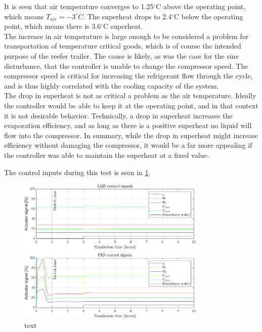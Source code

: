 It is seen that air temperature converges to 1.25$^{\circ}$C above the operating point, which means $T_{air} = -3^{\circ}C$. The superheat drops to 2.4$^{\circ}$C below the operating point, which means there is 3.6$^{\circ}$C superheat.\\

The increase in air temperature is large enough to be considered a problem for transportation of temperature critical goods, which is of course the intended purpose of the reefer trailer. The cause is likely, as was the case for the sine disturbance, that the controller is unable to change the compressor speed. The compressor speed is critical for increasing the refrigerant flow through the cycle, and is thus highly correlated with the cooling capacity of the system. \\

The drop in superheat is not as critical a problem as the air temperature. Ideally the controller would be able to keep it at the operating point, and in that context it is not desirable behavior. Technically, a drop in superheat increases the evaporation efficiency, and as long as there is a positive superheat no liquid will flow into the compressor. In summary, while the drop in superheat might increase efficiency without damaging the compressor, it would be a far more appealing if the controller was able to maintain the superheat at a fixed value.

The control inputs during this test is seen in \cref{fig:inputs_stepDist}.

\begin{figure}[H]
	\centering
	\includegraphics[width=0.8\textwidth]{Graphics/fig_inputs_stepDist.png}
	\caption{text}
	\label{fig:inputs_stepDist}
\end{figure}

